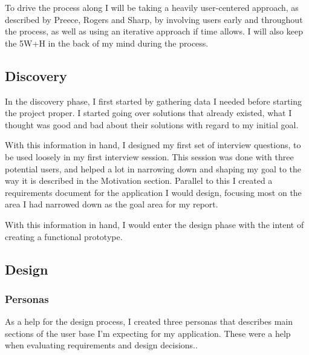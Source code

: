 \documentclass[a4paper,11pt]{report}
\begin{document}
To drive the process along I will be taking a heavily user-centered approach, as
described by Preece, Rogers and Sharp\cite{preece07:_inter_desig}, by involving
users early and throughout the process, as well as using an iterative approach
if time allows. I will also keep the 5W+H\cite{heim08:_reson_inter} in the back
of my mind during the process.

\subsection{Discovery}

In the discovery phase, I first started by gathering data I needed before
starting the project proper. I started going over solutions that already
existed, what I thought was good and bad about their solutions with regard to my
initial goal.

With this information in hand, I designed my first set of interview questions,
to be used loosely in my first interview session. This session was done with
three potential users, and helped a lot in narrowing down and shaping my goal
to the way it is described in the Motivation section. Parallel to this I created
a requirements document for the application I would design, focusing most on the
area I had narrowed down as the goal area for my report.

With this information in hand, I would enter the design phase with the intent of
creating a functional prototype.

\subsection{Design}

\subsubsection{Personas}

As a help for the design process, I created three personas that describes main
sections of the user base I'm expecting for my application. These were a help
when evaluating requirements and design decisions..
\end{document}
